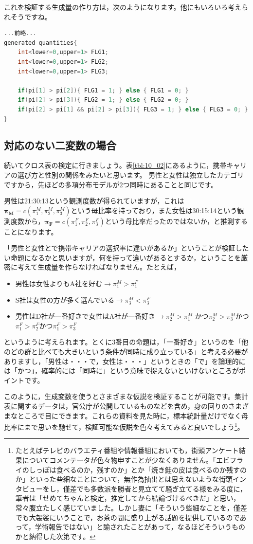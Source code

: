 \documentclass{ltjsbook}
\begin{document}
これを検証する生成量の作り方は，次のようになります。他にもいろいろ考えられそうですね。
\begin{lstlisting}[language=C++,label={stan:10_03},caption={多項分布からのデータ生成モデル}]
...前略...
generated quantities{
    int<lower=0,upper=1> FLG1;
    int<lower=0,upper=1> FLG2;
    int<lower=0,upper=1> FLG3;
    
    if(pi[1] > pi[2]){ FLG1 = 1; } else { FLG1 = 0; }
    if(pi[2] > pi[3]){ FLG2 = 1; } else { FLG2 = 0; }
    if(pi[2] > pi[1] && pi[2] > pi[3]){ FLG3 = 1; } else { FLG3 = 0; }
}
\end{lstlisting}
\subsection{対応のない二変数の場合}
続いてクロス表の検定に行きましょう。表\ref{tbl:10_02}にあるように，携帯キャリアの選び方と性別の関係をみたいと思います。
男性と女性は独立したカテゴリですから，先ほどの多項分布モデルが2つ同時にあることと同じです。

男性は21:30:13という観測度数が得られていますが，これは$\bm{\pi_M} = c(\pi_1^M,\pi_2^M,\pi_3^M)$という母比率を持っており，また女性は30:15:14という観測度数から，$\bm{\pi_F} = c(\pi_1^F,\pi_2^F,\pi_3^F)$という母比率だったのではないか，と推測することになります。

「男性と女性とで携帯キャリアの選択率に違いがあるか」ということが検証したい命題になるかと思いますが，何を持って違いがあるとするか，ということを厳密に考えて生成量を作らなければなりません。たとえば，
\begin{itemize}
	\item 男性は女性よりもA社を好む$\to \pi_1^M > \pi_1^F$
	\item S社は女性の方が多く選んでいる$\to \pi_3^M < \pi_3^F$
	\item 男性はD社が一番好きで女性はA社が一番好き$\to \pi_2^M > \pi_1^M$ かつ$\pi_2^M > \pi_3^M$かつ$\pi_1^F > \pi_2^F $かつ$ \pi_1^F > \pi_3^F$
\end{itemize}
というように考えられます。とくに3番目の命題は，「一番好き」というのを「他のどの群と比べても大きいという条件が同時に成り立っている」と考える必要がありますし，「男性は・・・で，女性は・・・」というときの「で」を論理的には「かつ」，確率的には「同時に」という意味で捉えないといけないところがポイントです。

このように，生成変数を使うとさまざまな仮説を検証することが可能です。集計表に関するデータは，官公庁が公開しているものなどを含め，身の回りのさまざまなところで目にできます。これらの資料を見た時に，標本統計量だけでなく母比率にまで思いを馳せて，検証可能な仮説を色々考えてみると良いでしょう\footnote{たとえばテレビのバラエティ番組や情報番組においても，街頭アンケート結果についてコメンテータが色々物申すことが少なくありません。「エビフライのしっぽは食べるのか，残すのか」とか「焼き鮭の皮は食べるのか残すのか」といった些細なことについて，無作為抽出とは思えないような街頭インタビューをし，僅差でも多数派を勝者と見立てて騒ぎ立てる様をみる度に，筆者は「せめてちゃんと検定，推定してから結論づけるべきだ」と思い，常々腹立たしく感じていました。しかし妻に「そういう些細なことを，僅差でも大袈裟にいうことで，お茶の間に盛り上がる話題を提供しているのであって，学術報告ではない」と諭されたことがあって，なるほどそういうものかと納得した次第です。}。
\end{document}
